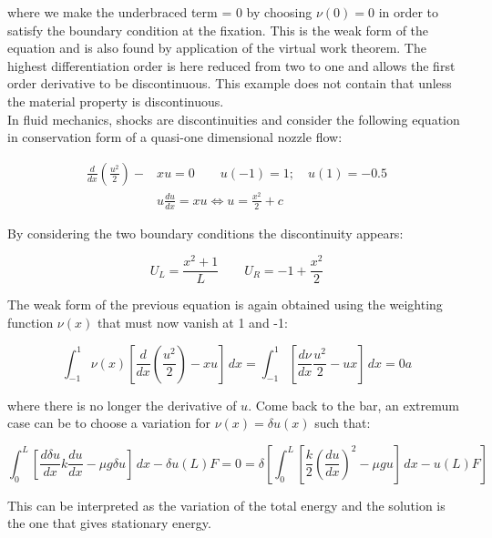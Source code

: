 where we make the underbraced term = 0 by choosing $\nu(0)=0$ in order to satisfy the boundary condition at the fixation. This is the weak form of the equation and is also found by application of the virtual work theorem. The highest differentiation order is here reduced from two to one and allows the first order derivative to be discontinuous. This example does not contain that unless the material property is discontinuous. \\

In fluid mechanics, shocks are discontinuities and consider the following equation in conservation form of a quasi-one dimensional nozzle flow: 

\begin{equation}
\begin{aligned}
\frac{d}{dx} \left( \frac{u^2}{2} \right) - &xu = 0 \qquad u(-1) = 1; \quad u(1) = -0.5\\
&u\frac{du}{dx} = xu  \Leftrightarrow u = \frac{x^2}{2}  + c 
\end{aligned}
\end{equation}

By considering the two boundary conditions the discontinuity appears: 

\begin{equation}
U_L = \frac{x^2 + 1}{L} \qquad U_R = -1 + \frac{x^2}{2}
\end{equation}

The weak form of the previous equation is again obtained using the weighting function $\nu (x)$ that must now vanish at 1 and -1: 

\begin{equation}
\int _{-1}^1 \nu (x)\left[ \frac{d}{dx}\left( \frac{u^2}{2} \right) - xu \right]\, dx = \int _{-1}^{1}\left[\frac{d\nu }{dx} \frac{u^2}{2} - ux \right]\, dx= 0a
\end{equation}

where there is no longer the derivative of $u$. Come back to the bar, an extremum case can be to choose a variation for $\nu(x) = \delta u(x)$ such that: 

\begin{equation}
\int _0 ^L \left[\frac{d\delta u}{dx} k \frac{du}{dx} - \mu g \delta u \right]\, dx  -\delta u (L) F = 0 = \delta \left[ \int _0 ^L \left[\frac{k}{2} \left(\frac{du}{dx}\right) ^2 - \mu g u \right]\, dx  -u(L) F \right]
\end{equation}

This can be interpreted as the variation of the total energy and the solution is the one that gives stationary energy.

